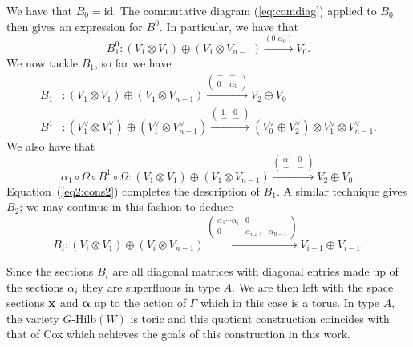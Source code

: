 \documentclass{amsart}
\newcommand{\balpha}{\boldsymbol{\alpha}}
\theoremstyle{definition}
\begin{document}
We have that $B_0 = \text{id}$.
The commutative diagram (\ref{eq:comdiag}) applied to $B_0$ then gives an expression for $B^0$.
In particular, we have that 
$$B_1^0 \colon (V_1 \otimes V_1) \oplus (V_1 \otimes V_{n-1}) \xrightarrow{(0\,\, \alpha_0)} V_0.$$
We now tackle $B_1$, so far we have 
\begin{align*}
    B_1 &\colon (V_1 \otimes V_1) \oplus (V_1 \otimes V_{n-1}) \xrightarrow{\begin{pmatrix} - & - \\ 0 & \alpha_0 \end{pmatrix}} V_2 \oplus V_0 \\
    B^1 &\colon (V_1^\vee \otimes V_1^\vee) \oplus (V_1^\vee \otimes V_{n-1}^\vee) \xrightarrow{\begin{pmatrix} 1 & 0 \\ - & - \end{pmatrix}} (V_0^\vee \oplus V_2^\vee) \otimes V_1^\vee \otimes V_{n-1}^\vee.
\end{align*}
We also have that
$$\alpha_1 \circ \Omega \circ B^1 \circ \Omega \colon (V_1 \otimes V_1) \oplus (V_1 \otimes V_{n-1}) \xrightarrow{\begin{pmatrix} \alpha_1 & 0 \\ - & - \end{pmatrix}} V_2 \oplus V_0.$$
Equation~(\ref{eq2:cons2}) completes the description of $B_1$.
A similar technique gives $B_2$; we may continue in this fashion to deduce 
$$B_i \colon (V_i \otimes V_1) \oplus (V_i \otimes V_{n-1}) \xrightarrow{\begin{pmatrix} \alpha_1\cdots\alpha_i & 0 \\ 0 & \alpha_{i+1}\cdots\alpha_{n-1} \end{pmatrix}} V_{i+1} \oplus V_{i-1}.$$

Since the sections $B_i$ are all diagonal matrices with diagonal entries made up of the sections $\alpha_i$ they are superfluous in type $A$.
We are then left with the space sections $\mathbf{x}$ and $\balpha$ up to the action of $\Gamma$ which in this case is a torus.
In type $A$, the variety $G$-Hilb$(W)$ is toric and this quotient construction coincides with that of Cox which achieves the goals of this construction in this work.
\end{document}
